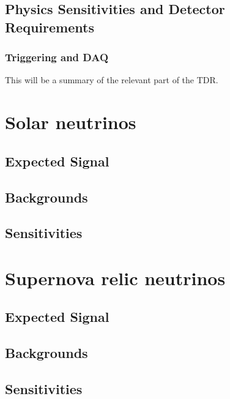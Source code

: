 \subsection{Physics Sensitivities and Detector Requirements}

\subsubsection{Triggering and DAQ}

This will be a summary of the relevant part of the TDR.

\section{Solar neutrinos}
\label{sec:snb-lowe-solar}



\subsection{Expected Signal}

\subsection{Backgrounds}

\subsection{Sensitivities}

\section{Supernova relic neutrinos}
\label{sec:snb-lowe-relic}

\subsection{Expected Signal}

\subsection{Backgrounds}

\subsection{Sensitivities}



